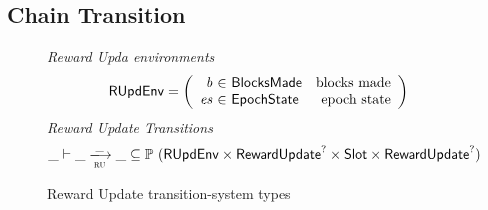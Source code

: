 \subsection{Chain Transition}
\label{sec:chain-trans}

\begin{figure}
  \emph{Reward Upda environments}
  \begin{equation*}
    \RUpdEnv =
    \left(
      \begin{array}{r@{~\in~}lr}
        \var{b} & \BlocksMade & \text{blocks made} \\
        \var{es} & \EpochState & \text{epoch state} \\
      \end{array}
    \right)
  \end{equation*}
  \emph{Reward Update Transitions}
  \begin{equation*}
    \_ \vdash \var{\_} \trans{ru}{\_} \var{\_} \subseteq
    \powerset (\RUpdEnv \times \RewardUpdate^? \times \Slot \times \RewardUpdate^?)
  \end{equation*}
  \caption{Reward Update transition-system types}
  \label{fig:ts-types:reward-update}
\end{figure}


